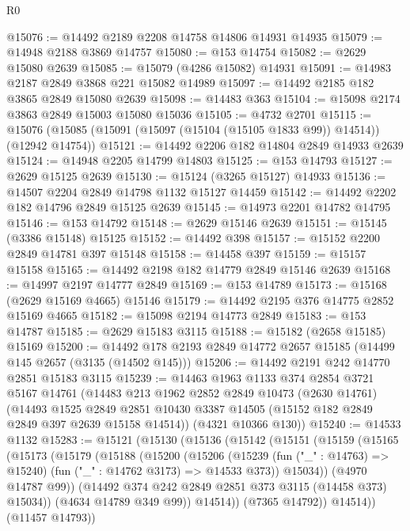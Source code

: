 \begin{lexlean}{R0}
\begin{coremodule}
@15076 := @14492 @2189 @2208 @14758 @14806 @14931 @14935
@15079 := @14948 @2188 @3869 @14757
@15080 := @153 @14754
@15082 := @2629 @15080 @2639
@15085 := @15079 (@4286 @15082) @14931
@15091 := @14983 @2187 @2849 @3868 @221 @15082 @14989
@15097 := @14492 @2185 @182 @3865 @2849 @15080 @2639
@15098 := @14483 @363
@15104 := @15098 @2174 @3863 @2849 @15003 @15080 @15036
@15105 := @4732 @2701
@15115 := @15076 (@15085 (@15091 (@15097 (@15104 (@15105 @1833 @99)) @14514)) (@12942 @14754))
@15121 := @14492 @2206 @182 @14804 @2849 @14933 @2639
@15124 := @14948 @2205 @14799 @14803
@15125 := @153 @14793
@15127 := @2629 @15125 @2639
@15130 := @15124 (@3265 @15127) @14933
@15136 := @14507 @2204 @2849 @14798 @1132 @15127 @14459
@15142 := @14492 @2202 @182 @14796 @2849 @15125 @2639
@15145 := @14973 @2201 @14782 @14795
@15146 := @153 @14792
@15148 := @2629 @15146 @2639
@15151 := @15145 (@3386 @15148) @15125
@15152 := @14492 @398
@15157 := @15152 @2200 @2849 @14781 @397 @15148
@15158 := @14458 @397
@15159 := @15157 @15158
@15165 := @14492 @2198 @182 @14779 @2849 @15146 @2639
@15168 := @14997 @2197 @14777 @2849
@15169 := @153 @14789
@15173 := @15168 (@2629 @15169 @4665) @15146
@15179 := @14492 @2195 @376 @14775 @2852 @15169 @4665
@15182 := @15098 @2194 @14773 @2849
@15183 := @153 @14787
@15185 := @2629 @15183 @3115
@15188 := @15182 (@2658 @15185) @15169
@15200 := @14492 @178 @2193 @2849 @14772 @2657 @15185 (@14499 @145 @2657 (@3135 (@14502 @145)))
@15206 := @14492 @2191 @242 @14770 @2851 @15183 @3115
@15239 := @14463
    @1963
    @1133
    @374
    @2854
    @3721
    @5167
    @14761
    (@14483
      @213
      @1962
      @2852
      @2849
      @10473
      (@2630 @14761)
      (@14493
        @1525
        @2849
        @2851
        @10430
        @3387
        @14505
        (@15152 @182 @2849 @2849 @397 @2639 @15158 @14514))
      (@4321 @10366 @130))
@15240 := @14533 @1132
@15283 := @15121
    (@15130
      (@15136
        (@15142
          (@15151
            (@15159
              (@15165
                (@15173
                  (@15179
                    (@15188
                      (@15200
                        (@15206
                          (@15239
                            (fun ("_" : @14763) => @15240)
                            (fun ("_" : @14762 @3173) => @14533 @373))
                          @15034))
                      (@4970 @14787 @99))
                    (@14492 @374 @242 @2849 @2851 @373 @3115 (@14458 @373) @15034))
                  (@4634 @14789 @349 @99))
                @14514))
            (@7365 @14792))
          @14514))
      (@11457 @14793))

\end{coremodule}
\end{lexlean}
